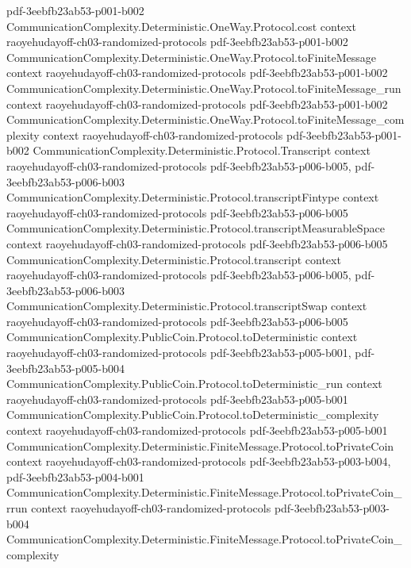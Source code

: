\begin{theorem}
  {pdf-3eebfb23ab53-p001-b002}
\proofstep
  {CommunicationComplexity.Deterministic.OneWay.Protocol.cost}
  {context}
  {raoyehudayoff-ch03-randomized-protocols}
  {pdf-3eebfb23ab53-p001-b002}
\proofstep
  {CommunicationComplexity.Deterministic.OneWay.Protocol.toFiniteMessage}
  {context}
  {raoyehudayoff-ch03-randomized-protocols}
  {pdf-3eebfb23ab53-p001-b002}
\proofstep
  {CommunicationComplexity.Deterministic.OneWay.Protocol.toFiniteMessage_run}
  {context}
  {raoyehudayoff-ch03-randomized-protocols}
  {pdf-3eebfb23ab53-p001-b002}
\proofstep
  {CommunicationComplexity.Deterministic.OneWay.Protocol.toFiniteMessage_complexity}
  {context}
  {raoyehudayoff-ch03-randomized-protocols}
  {pdf-3eebfb23ab53-p001-b002}
\proofstep
  {CommunicationComplexity.Deterministic.Protocol.Transcript}
  {context}
  {raoyehudayoff-ch03-randomized-protocols}
  {pdf-3eebfb23ab53-p006-b005,
    pdf-3eebfb23ab53-p006-b003}
\proofstep
  {CommunicationComplexity.Deterministic.Protocol.transcriptFintype}
  {context}
  {raoyehudayoff-ch03-randomized-protocols}
  {pdf-3eebfb23ab53-p006-b005}
\proofstep
  {CommunicationComplexity.Deterministic.Protocol.transcriptMeasurableSpace}
  {context}
  {raoyehudayoff-ch03-randomized-protocols}
  {pdf-3eebfb23ab53-p006-b005}
\proofstep
  {CommunicationComplexity.Deterministic.Protocol.transcript}
  {context}
  {raoyehudayoff-ch03-randomized-protocols}
  {pdf-3eebfb23ab53-p006-b005,
    pdf-3eebfb23ab53-p006-b003}
\proofstep
  {CommunicationComplexity.Deterministic.Protocol.transcriptSwap}
  {context}
  {raoyehudayoff-ch03-randomized-protocols}
  {pdf-3eebfb23ab53-p006-b005}
\proofstep
  {CommunicationComplexity.PublicCoin.Protocol.toDeterministic}
  {context}
  {raoyehudayoff-ch03-randomized-protocols}
  {pdf-3eebfb23ab53-p005-b001,
    pdf-3eebfb23ab53-p005-b004}
\proofstep
  {CommunicationComplexity.PublicCoin.Protocol.toDeterministic_run}
  {context}
  {raoyehudayoff-ch03-randomized-protocols}
  {pdf-3eebfb23ab53-p005-b001}
\proofstep
  {CommunicationComplexity.PublicCoin.Protocol.toDeterministic_complexity}
  {context}
  {raoyehudayoff-ch03-randomized-protocols}
  {pdf-3eebfb23ab53-p005-b001}
\proofstep
  {CommunicationComplexity.Deterministic.FiniteMessage.Protocol.toPrivateCoin}
  {context}
  {raoyehudayoff-ch03-randomized-protocols}
  {pdf-3eebfb23ab53-p003-b004,
    pdf-3eebfb23ab53-p004-b001}
\proofstep
  {CommunicationComplexity.Deterministic.FiniteMessage.Protocol.toPrivateCoin_rrun}
  {context}
  {raoyehudayoff-ch03-randomized-protocols}
  {pdf-3eebfb23ab53-p003-b004}
\proofstep
  {CommunicationComplexity.Deterministic.FiniteMessage.Protocol.toPrivateCoin_complexity}

\end{theorem}
